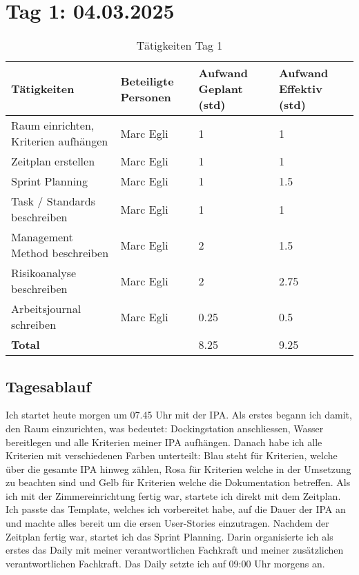 \section{Tag 1: 04.03.2025}
\begin{table}[H]
    \begin{tabular}{|L{0.4\textwidth}|C{60pt}|C{60pt}|C{60pt}|}
        \hline
        \color{white}Tätigkeiten & \color{white}Beteiligte \color{white}Personen & \color{white}Aufwand Geplant (std) & \color{white}Aufwand Effektiv (std) \\
        \hline
         Raum einrichten, Kriterien aufhängen & Marc Egli & 1 & 1 \\
        \hline
        Zeitplan erstellen & Marc Egli & 1 & 1 \\
        \hline
        Sprint Planning & Marc Egli & 1 & 1.5 \\
        \hline
        Task / Standards beschreiben & Marc Egli & 1 & 1 \\
        \hline
        Management Method beschreiben & Marc Egli & 2 & 1.5 \\
        \hline
        Risikoanalyse beschreiben & Marc Egli & 2 & 2.75 \\
        \hline
        Arbeitsjournal schreiben & Marc Egli & 0.25 & 0.5 \\
        \hline
        \textbf{Total} &  & 8.25 & 9.25 \\
        \hline
    \end{tabular}
    \caption{Tätigkeiten Tag 1}
\end{table}

\subsection*{Tagesablauf}
Ich startet heute morgen um 07.45 Uhr mit der IPA. Als erstes begann ich damit, den Raum einzurichten, was bedeutet: 
Dockingstation anschliessen, Wasser bereitlegen und alle Kriterien meiner IPA aufhängen. Danach habe ich alle Kriterien mit verschiedenen
Farben unterteilt: Blau steht für Kriterien, welche über die gesamte IPA hinweg zählen, Rosa für Kriterien welche in der Umsetzung zu beachten sind und 
Gelb für Kriterien welche die Dokumentation betreffen. Als ich mit der Zimmereinrichtung fertig war, startete ich direkt mit dem Zeitplan. Ich passte das Template,
welches ich vorbereitet habe, auf die Dauer der IPA an und machte alles bereit um die ersen User-Stories einzutragen.  Nachdem der Zeitplan fertig war, startet ich das Sprint Planning.
Darin organisierte ich als erstes das Daily mit meiner verantwortlichen Fachkraft und meiner zusätzlichen verantwortlichen Fachkraft. Das Daily setzte ich auf
09:00 Uhr morgens an. 

